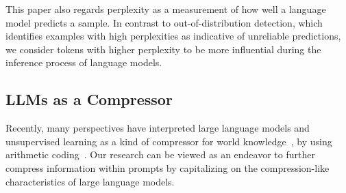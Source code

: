 This paper also regards perplexity as a measurement of how well a language model predicts a sample.
In contrast to out-of-distribution detection, which identifies examples with high perplexities as indicative of unreliable predictions, we consider tokens with higher perplexity to be more influential during the inference process of language models. 


\subsection{LLMs as a Compressor}

Recently, many perspectives have interpreted large language models and unsupervised learning as a kind of compressor for world knowledge~\cite{ilya2023unsupervised, deletang2023language}, 
by using arithmetic coding~\cite{rissanen1976generalized,pasco1976source}. Our research can be viewed as an endeavor to further compress information within prompts by capitalizing on the compression-like characteristics of large language models.

